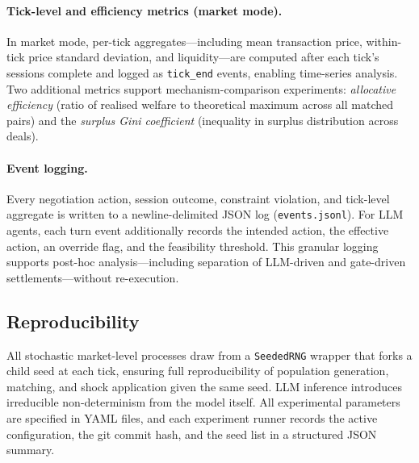 \paragraph{Tick-level and efficiency metrics (market mode).}
In market mode, per-tick aggregates---including mean transaction price, within-tick price standard deviation, and liquidity---are computed after each tick's sessions complete and logged as \texttt{tick\_end} events, enabling time-series analysis.  Two additional metrics support mechanism-comparison experiments: \emph{allocative efficiency} (ratio of realised welfare to theoretical maximum across all matched pairs) and the \emph{surplus Gini coefficient} (inequality in surplus distribution across deals).

\paragraph{Event logging.}
Every negotiation action, session outcome, constraint violation, and tick-level aggregate is written to a newline-delimited JSON log (\texttt{events.jsonl}).  For LLM agents, each turn event additionally records the intended action, the effective action, an override flag, and the feasibility threshold.  This granular logging supports post-hoc analysis---including separation of LLM-driven and gate-driven settlements---without re-execution.

\subsection{Reproducibility}
\label{sec:reproducibility}

All stochastic market-level processes draw from a \texttt{SeededRNG} wrapper that forks a child seed at each tick, ensuring full reproducibility of population generation, matching, and shock application given the same seed.  LLM inference introduces irreducible non-determinism from the model itself.  All experimental parameters are specified in YAML files, and each experiment runner records the active configuration, the git commit hash, and the seed list in a structured JSON summary.
